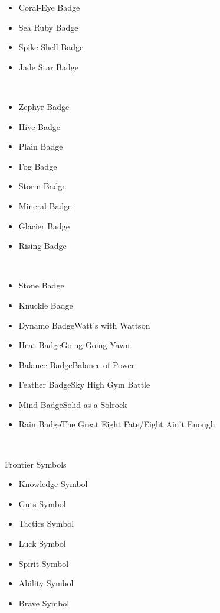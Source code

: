 \documentclass[a4paper,12pt]{article}
\begin{document}
\begin{itemize}
\item Coral-Eye Badge
\item Sea Ruby Badge
\item Spike Shell Badge
\item Jade Star Badge
\end{itemize}\\ \par \vspace{0.5cm}

\begin{itemize}
\item Zephyr Badge
\item Hive Badge
\item Plain Badge
\item Fog Badge
\item Storm Badge
\item Mineral Badge
\item Glacier Badge
\item Rising Badge
\end{itemize}\\ \par \vspace{0.5cm}

\begin{itemize}
\item Stone Badge
\item Knuckle Badge
\item Dynamo BadgeWatt's with Wattson
\item Heat BadgeGoing Going Yawn
\item Balance BadgeBalance of Power
\item Feather BadgeSky High Gym Battle
\item Mind BadgeSolid as a Solrock
\item Rain BadgeThe Great Eight Fate/Eight Ain't Enough
\end{itemize}\\ \par \vspace{0.5cm}

Frontier Symbols\\ \par \vspace{0.5cm}

\begin{itemize}
\item Knowledge Symbol
\item Guts Symbol
\item Tactics Symbol
\item Luck Symbol
\item Spirit Symbol
\item Ability Symbol
\item Brave Symbol
\end{itemize}\\ \par \vspace{0.5cm}
\end{document}
